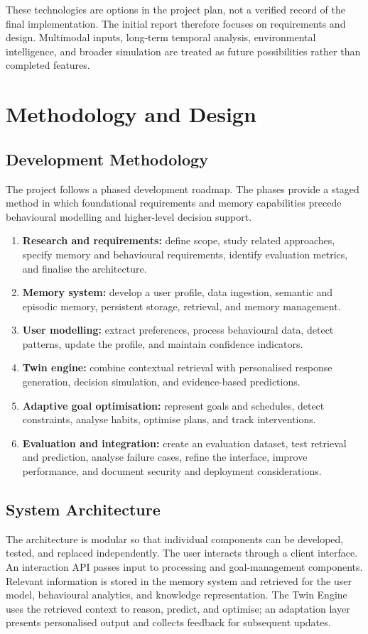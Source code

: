 \documentclass{tietreport}
\begin{document}
These technologies are options in the project plan, not a verified record of the final implementation. The initial report therefore focuses on requirements and design. Multimodal inputs, long-term temporal analysis, environmental intelligence, and broader simulation are treated as future possibilities rather than completed features.

\chapter{Methodology and Design}

\section{Development Methodology}
The project follows a phased development roadmap. The phases provide a staged method in which foundational requirements and memory capabilities precede behavioural modelling and higher-level decision support.
\begin{enumerate}[leftmargin=*]
  \item \textbf{Research and requirements:} define scope, study related approaches, specify memory and behavioural requirements, identify evaluation metrics, and finalise the architecture.
  \item \textbf{Memory system:} develop a user profile, data ingestion, semantic and episodic memory, persistent storage, retrieval, and memory management.
  \item \textbf{User modelling:} extract preferences, process behavioural data, detect patterns, update the profile, and maintain confidence indicators.
  \item \textbf{Twin engine:} combine contextual retrieval with personalised response generation, decision simulation, and evidence-based predictions.
  \item \textbf{Adaptive goal optimisation:} represent goals and schedules, detect constraints, analyse habits, optimise plans, and track interventions.
  \item \textbf{Evaluation and integration:} create an evaluation dataset, test retrieval and prediction, analyse failure cases, refine the interface, improve performance, and document security and deployment considerations.
\end{enumerate}

\section{System Architecture}
The architecture is modular so that individual components can be developed, tested, and replaced independently. The user interacts through a client interface. An interaction API passes input to processing and goal-management components. Relevant information is stored in the memory system and retrieved for the user model, behavioural analytics, and knowledge representation. The Twin Engine uses the retrieved context to reason, predict, and optimise; an adaptation layer presents personalised output and collects feedback for subsequent updates.
\end{document}
